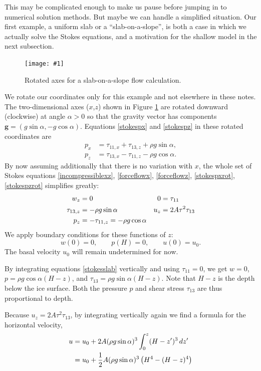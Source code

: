 \documentclass[letterpaper,final,12pt,reqno]{amsart}
\newcommand{\onefigsize}[3]{
\begin{figure}[ht]
\centering
\texttt{[image: \#1]}
\caption{#2}
\label{fig:#1}
\end{figure}}
\newcommand{\onefig}[2]{\onefigsize{#1}{#2}{3.0in}}
\begin{document}
This may be complicated enough to make us pause before jumping in to numerical solution methods.  But maybe we can handle a simplified situation.  Our first example, a uniform slab or a ``slab-on-a-slope'', is both a case in which we actually solve the Stokes equations, and a motivation for the shallow model in the next subsection.

\onefig{slab}{Rotated axes for a slab-on-a-slope flow calculation.}

We rotate our coordinates only for this example and not elsewhere in these notes.  The two-dimensional axes ($x$,$z$) shown in Figure \ref{fig:slab} are rotated downward (clockwise) at angle $\alpha>0$ so that the gravity vector has components $\mathbf{g} = (g \sin\alpha,- g \cos \alpha)$.  Equations \eqref{stokespx} and \eqref{stokespz} in these rotated coordinates are
\begin{align}
p_x &= \tau_{11,x} + \tau_{13,z} + \rho g \sin\alpha, \label{stokespxrot} \\
p_z &= \tau_{13,x} - \tau_{11,z} - \rho g \cos\alpha. \label{stokespzrot}
\end{align}
By now assuming additionally that there is no variation with $x$, the whole set of Stokes equations \eqref{incompressiblexz}, \eqref{forceflowx}, \eqref{forceflowz}, \eqref{stokespxrot}, \eqref{stokespzrot} simplifies greatly:
\begin{align}
w_z &= 0 &   0 &= \tau_{11} \label{stokesslab} \\
\tau_{13,z} &= - \rho g \sin\alpha &   u_z &= 2 A \tau^2 \tau_{13} \notag \\
p_z &= -\tau_{11,z} = - \rho g \cos\alpha \notag
\end{align}
We apply boundary conditions for these functions of $z$:
	$$w(0)=0, \qquad p(H)=0, \qquad u(0)=u_0.$$
The basal velocity $u_0$ will remain undetermined for now.

By integrating equations \eqref{stokesslab} vertically and using $\tau_{11}=0$, we get $w=0$, $p = \rho g \cos\alpha (H-z)$, and $\tau_{13} = \rho g \sin\alpha (H-z)$.  Note that $H-z$ is the depth below the ice surface.  Both the pressure $p$ and shear stress $\tau_{13}$ are thus proportional to depth.

Because $u_z = 2 A \tau^2 \tau_{13}$, by integrating vertically again we find a formula for the horizontal velocity,
\begin{align}
u &= u_0 + 2 A (\rho g \sin\alpha)^3 \int_0^z (H-z')^3\,dz' \notag \\
  &= u_0 + \frac{1}{2} A (\rho g \sin\alpha)^3  \left(H^4 - (H-z)^4\right)  \label{uslab}
\end{align}
\end{document}
